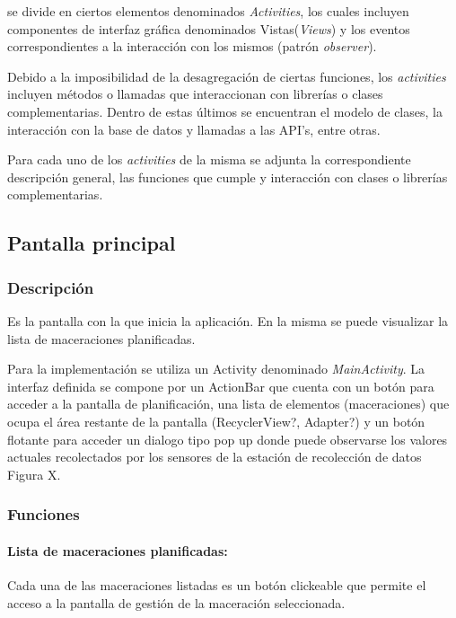     
    se divide en ciertos elementos denominados \textit{Activities}, los cuales incluyen componentes de interfaz gráfica denominados Vistas(\textit{Views}) y los eventos correspondientes a la interacción con los mismos (patrón \textit{observer}). 
    
    \par Debido a la imposibilidad de la desagregación de ciertas funciones, los \textit{activities} incluyen métodos o llamadas que interaccionan con librerías o clases complementarias. Dentro de estas últimos se encuentran el modelo de clases, la interacción con la base de datos y llamadas a las API's, entre otras.
    
    \par Para cada uno de los \textit{activities} de la misma se adjunta la correspondiente descripción general, las funciones que cumple y interacción con clases o librerías complementarias. 
    
    
        \subsection{Pantalla principal}
        
            \subsubsection{Descripción}
                \par Es la pantalla con la que inicia la aplicación. En la misma se puede visualizar la lista de maceraciones planificadas.
                
                \par Para la implementación se utiliza un Activity denominado \textit{MainActivity}. La interfaz definida se compone por un ActionBar que cuenta con un botón para acceder a la pantalla de planificación, una lista de elementos (maceraciones) que ocupa el área restante de la pantalla (RecyclerView?, Adapter?) y un botón flotante para acceder un dialogo tipo pop up donde puede observarse los valores actuales recolectados por los sensores de la estación de recolección de datos Figura X. 
                
            \subsubsection{Funciones}
                \paragraph{Lista de maceraciones planificadas:}
                Cada una de las maceraciones listadas es un botón clickeable que permite el acceso a la pantalla de gestión de la maceración seleccionada.
